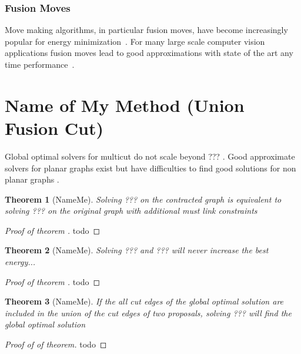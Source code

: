 \documentclass[10pt,twocolumn,letterpaper]{article}
\newtheorem{theorem}{Theorem}
\begin{document}
\subsubsection{Fusion Moves}
Move making algorithms, in particular fusion moves, 
have become increasingly popular for energy minimization~\cite{???,kappes_2014_ws}.
For many large scale computer vision applications fusion moves lead to good approximations
with state of the art any time performance~\cite{kappes_2014_ws}.








\section{Name of My Method (Union Fusion Cut)}

Global optimal solvers for multicut do not scale beyond ??? \cite{???}.
Good approximate solvers for planar graphs exist \cite{beifiger_2014_cvpr,yarkony_2012_eccv} 
but have difficulties to find good solutions for non planar graphs \cite{beier_2014_cvpr}.


\begin{theorem}[NameMe]
Solving ??? on the contracted graph is 
equivalent to solving ??? on the 
original graph with additional 
must link constraints
\end{theorem}

\begin{proof}[Proof of theorem ]
todo
\end{proof}



\begin{theorem}[NameMe]
Solving ??? and ??? will never increase the best energy...
\end{theorem}

\begin{proof}[Proof of theorem ]
todo
\end{proof}



\begin{theorem}[NameMe]
If the all cut edges of the global optimal
solution are included in the union of
the cut edges of two proposals, solving
??? will find the global optimal solution
\end{theorem}

\begin{proof}[Proof of of theorem]
todo
\end{proof}
\end{document}
